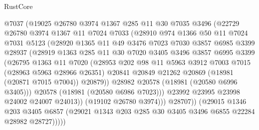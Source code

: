 \begin{lexlean}{RustCore}
\begin{coremodule}
                @7037
                (@19025
                  @26780
                  @3974
                  @1367
                  @285
                  @11
                  @30
                  @7035
                  @3496
                  (@22729
                    @26780
                    @3974
                    @1367
                    @11
                    @7024
                    @7033
                    (@28910
                      @974
                      @1366
                      @50
                      @11
                      @7024
                      @7031
                      @5123
                      (@28920
                        @1365
                        @11
                        @49
                        @3476
                        @7023
                        @7030
                        @3857
                        @6985
                        @3399
                        @28937
                        (@28919
                          @1363
                          @285
                          @11
                          @30
                          @7020
                          @3405
                          @3496
                          @3857
                          @6995
                          @3399
                          (@26795
                            @1363
                            @11
                            @7020
                            (@28953
                              @202
                              @98
                              @11
                              @5963
                              @3912
                              @7003
                              @7015
                              (@28963 @5963 @28966 @26351)
                              @20841
                              @20849
                              @21262
                              @20869
                              (@18981 (@20871 @7015 @7004))
                              @20879))
                          @28982
                          @20578
                          (@18981 (@20580 @6996 @3405)))
                        @20578
                        (@18981 (@20580 @6986 @7023)))
                      @23992
                      @23995
                      @23998
                      @24002
                      @24007
                      @24013))
                  (@19102 @26780 @3974)))
              @28707))
          (@29015
            @1346
            @203
            @3405
            @6857
            (@29021 @1343 @203 @285 @30 @3405 @3496 @6855 @22284 @28982 @28727)))))

\end{coremodule}
\end{lexlean}
